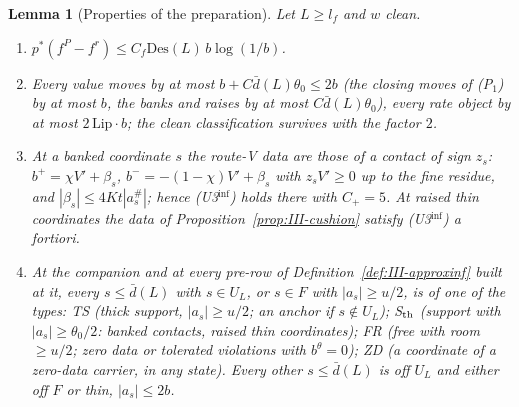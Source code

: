 \documentclass[10pt]{amsart}
\newtheorem{lemma}[theorem]{Lemma}
\theoremstyle{definition}
\theoremstyle{remark}
\begin{document}
\begin{lemma}[Properties of the preparation]\label{lem:III-prep}
Let $L\ge l_f$ and $w$ clean.
\begin{enumerate}
\item[(a)] $p^*(f^P-f^r)\le C_f\mathrm{Des}(L)\,b\log(1/b)$.
\item[(b)] Every value moves by at most $b+C\bar d(L)\theta_0\le2b$ \textup{(}the
closing moves of \textup{(P$_1$)} by at most $b$, the banks and raises by at most
$C\bar d(L)\theta_0$\textup{)}, every rate object by at most
$2\,\mathrm{Lip}\cdot b$; the clean classification survives with the factor $2$.
\item[(c)] At a banked coordinate $s$ the route-V data are those of a contact of
sign $z_s$: $b^+=\chi V'+\beta_s$, $b^-=-(1-\chi)V'+\beta_s$ with $z_sV'\ge0$ up
to the fine residue, and $|\beta_s|\le4Kt|a^\#_s|$; hence
\textup{(U3$^{\inf}$)} holds there with $C_+=5$.  At raised thin
coordinates the data of Proposition~\textup{\ref{prop:III-cushion}} satisfy
\textup{(U3$^{\inf}$)} a fortiori.
\item[(d)] At the companion and at every pre-row of
Definition~\textup{\ref{def:III-approxinf}} built at it, every $s\le\bar d(L)$
with $s\in U_L$, or $s\in F$ with $|a_s|\ge u/2$, is of one of the types:
\textup{TS} (thick support, $|a_s|\ge u/2$; an \emph{anchor} if $s\notin U_L$);
\textup{S$_{\rm th}$} (support with $|a_s|\ge\theta_0/2$: banked contacts, raised
thin coordinates); \textup{FR} (free with room $\ge u/2$; zero data or tolerated
violations with $b^\theta=0$); \textup{ZD} (a coordinate of a zero-data carrier,
in any state).  Every other $s\le\bar d(L)$ is off $U_L$ and either off $F$ or
thin, $|a_s|\le2b$.
\end{enumerate}
\end{lemma}
\end{document}
